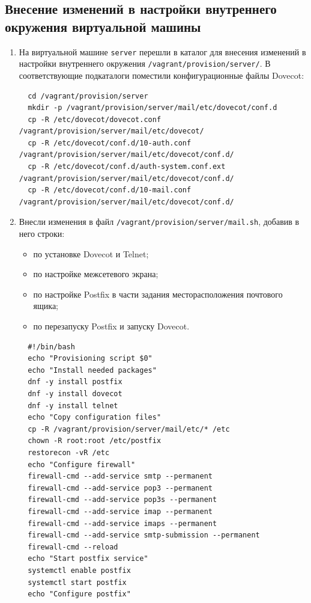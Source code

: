 \subsection{Внесение изменений в настройки внутреннего окружения виртуальной машины}
\begin{enumerate}

\item На виртуальной машине \texttt{server} перешли в каталог для внесения изменений в настройки внутреннего окружения \texttt{/vagrant/provision/server/}. В соответствующие подкаталоги поместили конфигурационные файлы Dovecot:
\begin{verbatim}
  cd /vagrant/provision/server
  mkdir -p /vagrant/provision/server/mail/etc/dovecot/conf.d
  cp -R /etc/dovecot/dovecot.conf /vagrant/provision/server/mail/etc/dovecot/
  cp -R /etc/dovecot/conf.d/10-auth.conf /vagrant/provision/server/mail/etc/dovecot/conf.d/
  cp -R /etc/dovecot/conf.d/auth-system.conf.ext /vagrant/provision/server/mail/etc/dovecot/conf.d/
  cp -R /etc/dovecot/conf.d/10-mail.conf /vagrant/provision/server/mail/etc/dovecot/conf.d/
\end{verbatim}
\item Внесли изменения в файл \texttt{/vagrant/provision/server/mail.sh}, добавив в него строки:
\begin{itemize}
  \item по установке Dovecot и Telnet;
  \item по настройке межсетевого экрана;
  \item по настройке Postfix в части задания месторасположения почтового ящика;
  \item по перезапуску Postfix и запуску Dovecot.
\end{itemize}
\begin{verbatim}
  #!/bin/bash
  echo "Provisioning script $0"
  echo "Install needed packages"
  dnf -y install postfix
  dnf -y install dovecot
  dnf -y install telnet
  echo "Copy configuration files"
  cp -R /vagrant/provision/server/mail/etc/* /etc
  chown -R root:root /etc/postfix
  restorecon -vR /etc
  echo "Configure firewall"
  firewall-cmd --add-service smtp --permanent
  firewall-cmd --add-service pop3 --permanent
  firewall-cmd --add-service pop3s --permanent
  firewall-cmd --add-service imap --permanent
  firewall-cmd --add-service imaps --permanent
  firewall-cmd --add-service smtp-submission --permanent
  firewall-cmd --reload
  echo "Start postfix service"
  systemctl enable postfix
  systemctl start postfix
  echo "Configure postfix"

\end{verbatim}
\end{enumerate}

